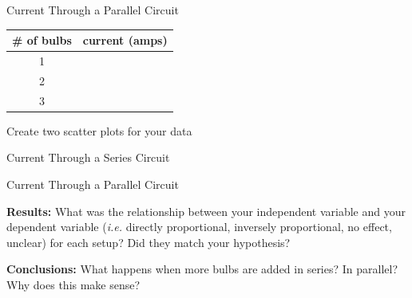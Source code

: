 \documentclass[10pt]{exam}
\begin{document}
\begin{questions}
\begin{multicols}{2}
      Current Through a Parallel Circuit

      \begin{tabular}{|c|c|}
        \hline
        \# of bulbs & current (amps) \\\hline
        1 &\\\hline
        2 &\\\hline
        3 &\\\hline
      \end{tabular}

    \end{multicols}

\question
  Create two scatter plots for your data


    \begin{multicols}{2}
      Current Through a Series Circuit


      Current Through a Parallel Circuit


    \end{multicols}
                 
\question
  \textbf{Results:} What was the relationship between your independent variable and your dependent variable (\emph{i.e.} directly proportional, inversely proportional, no effect, unclear) for each setup?  Did they match your hypothesis?
  \vs

\question
  \textbf{Conclusions:}  What happens when more bulbs are added in series?  In parallel?  Why does this make sense?
  \vs

  
\end{questions}
\end{document}
